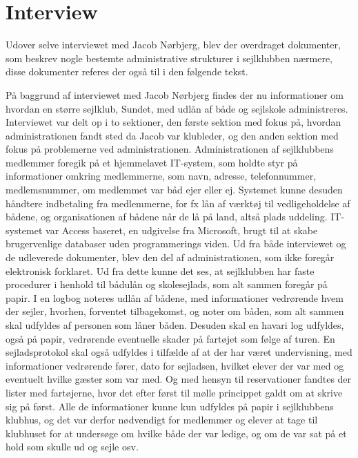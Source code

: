\chapter{Interview}\label{chap:Interview}
Udover selve interviewet med Jacob Nørbjerg, blev der overdraget dokumenter, som beskrev nogle bestemte administrative strukturer i sejlklubben nærmere, disse dokumenter referes der også til i den følgende tekst.

På baggrund af interviewet med Jacob Nørbjerg findes der nu informationer om hvordan en større sejlklub, Sundet, med udlån af både og sejlskole administreres. Interviewet var delt op i to sektioner, den første sektion med fokus på, hvordan administrationen fandt sted da Jacob var klubleder, og den anden sektion med fokus på problemerne ved administrationen. Administrationen af sejlklubbens medlemmer foregik på et hjemmelavet IT-system, som holdte styr på informationer omkring medlemmerne, som navn, adresse, telefonnummer, medlemsnummer, om medlemmet var båd ejer eller ej. Systemet kunne desuden håndtere indbetaling fra medlemmerne, for fx lån af værktøj til vedligeholdelse af bådene, og organisationen af bådene når de lå på land, altså plads uddeling. IT-systemet var Access baseret, en udgivelse fra Microsoft, brugt til at skabe brugervenlige databaser uden programmerings viden.
Ud fra både interviewet og de udleverede dokumenter, blev den del af administrationen, som ikke foregår elektronisk forklaret. Ud fra dette kunne det ses, at sejlklubben har faste procedurer i henhold til bådulån og skolesejlads, som alt sammen foregår på papir. I en logbog noteres udlån af bådene, med informationer vedrørende hvem der sejler, hvorhen, forventet tilbagekomst, og noter om båden, som alt sammen skal udfyldes af personen som låner båden. Desuden skal en havari log udfyldes, også på papir, vedrørende eventuelle skader på fartøjet som følge af turen. En sejladsprotokol skal også udfyldes i tilfælde af at der har været undervisning, med informationer vedrørende fører, dato for sejladsen, hvilket elever der var med og eventuelt hvilke gæster som var med. Og med hensyn til reservationer fandtes der lister med fartøjerne, hvor det efter først til mølle princippet galdt om at skrive sig på først. Alle de informationer kunne kun udfyldes på papir i sejlklubbens klubhus, og det var derfor nødvendigt for medlemmer og elever at tage til klubhuset for at undersøge om hvilke både der var ledige, og om de var sat på et hold som skulle ud og sejle osv. 

